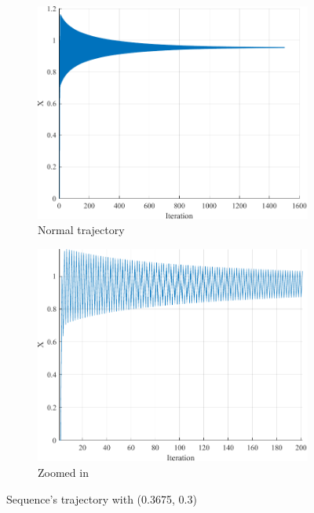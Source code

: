 \begin{figure}[H]
	\centering
	\begin{subfigure}{0.4\textwidth}
		\centering
		\includegraphics[width=\textwidth]{../Problem 3/prob3_(c)_a_0.365_b_0.3.pdf}
		\caption{Normal trajectory}
	\end{subfigure}
	\begin{subfigure}{0.4\textwidth}
		\centering
		\includegraphics[width=\textwidth]{../Problem 3/prob3_(c)_a_0.365_b_0.3_zoomed.pdf}
		\caption{Zoomed in}
	\end{subfigure}
	\caption{Sequence's trajectory with (0.3675, 0.3)}
	\label{fig:prob3_c}
\end{figure}

